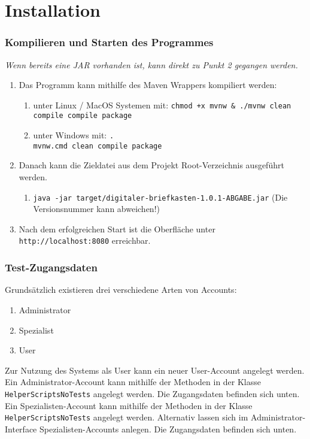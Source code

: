 

\section{Installation}
\label{instal}

\subsubsection*{Kompilieren und Starten des Programmes}
\textit{Wenn bereits eine JAR vorhanden ist, kann direkt zu Punkt 2 gegangen werden.}
\begin{enumerate}
	\item{Das Programm kann mithilfe des Maven Wrappers kompiliert werden:}
	\begin{enumerate}
		\item{unter Linux / MacOS Systemen mit: \texttt{chmod +x mvnw \& ./mvnw clean compile compile package}}
		\item{unter Windows mit: \texttt{.\\mvnw.cmd clean compile package}}
	\end{enumerate}
	\item{Danach kann die Zieldatei aus dem Projekt Root-Verzeichnis ausgeführt werden.}
	\begin{enumerate}
		\item{\texttt{java -jar target/digitaler-briefkasten-1.0.1-ABGABE.jar} (Die Versionsnummer kann abweichen!)}
	\end{enumerate}
	\item{Nach dem erfolgreichen Start ist die Oberfläche unter \texttt{http://localhost:8080} erreichbar.}
\end{enumerate}

\subsubsection*{Test-Zugangsdaten}
Grundsätzlich existieren drei verschiedene Arten von Accounts:
\begin{enumerate}
	\item{Administrator}
	\item{Spezialist}
	\item{User}
\end{enumerate}

Zur Nutzung des Systems als User kann ein neuer User-Account angelegt werden.\\
Ein Administrator-Account kann mithilfe der Methoden in der Klasse \texttt{HelperScriptsNoTests} angelegt werden. Die Zugangsdaten befinden sich unten.\\
Ein Spezialisten-Account kann mithilfe der Methoden in der Klasse \texttt{HelperScriptsNoTests} angelegt werden. Alternativ lassen sich im Administrator-Interface Spezialisten-Accounts anlegen. Die Zugangsdaten befinden sich unten.

